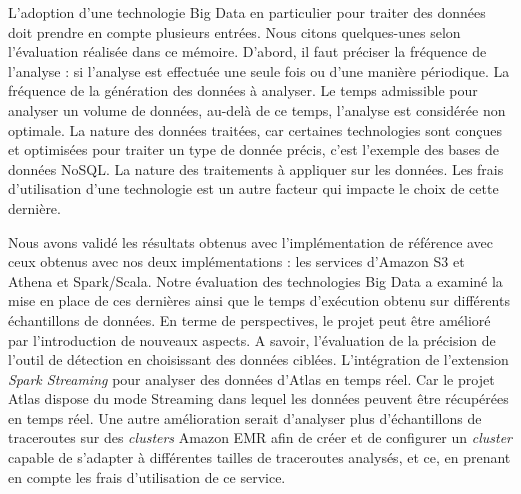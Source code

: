 L'adoption d'une technologie Big Data en particulier pour traiter des données  doit prendre en compte plusieurs entrées. Nous citons quelques-unes selon l'évaluation réalisée dans ce mémoire. D'abord, il faut préciser la fréquence de l'analyse : si l'analyse est effectuée une seule fois ou d'une manière périodique. La fréquence de la génération des données à analyser.   Le temps admissible pour analyser un volume de données, au-delà de ce temps, l'analyse est considérée non optimale. 
La nature des données traitées, car certaines technologies sont conçues  et optimisées pour traiter un type de donnée précis, c'est l'exemple des bases de données NoSQL. La nature des traitements à appliquer sur les données. Les frais d'utilisation d'une technologie est un autre facteur qui impacte le choix de cette dernière. 




Nous avons validé les résultats obtenus   avec  l'implémentation de référence avec ceux obtenus avec nos deux implémentations : les services d'Amazon S3 et Athena et  Spark/Scala. Notre évaluation des technologies Big Data a examiné la mise en place de ces dernières ainsi que  le temps d'exécution obtenu sur différents échantillons de données. En terme de perspectives, le projet peut être amélioré par l'introduction de nouveaux aspects. A savoir, l'évaluation de la précision de l'outil de détection  en choisissant des données ciblées. L'intégration  de l'extension \textit{Spark Streaming} pour analyser des données  d'Atlas en temps réel. Car  le projet Atlas dispose du mode Streaming dans lequel les données peuvent être récupérées en temps réel.  Une autre amélioration serait d'analyser plus d'échantillons de traceroutes sur des \textit{clusters} Amazon EMR  afin de créer et de configurer  un \textit{cluster}  capable de s'adapter à différentes tailles de traceroutes analysés,  et ce, en prenant en compte les frais d'utilisation de ce service.


